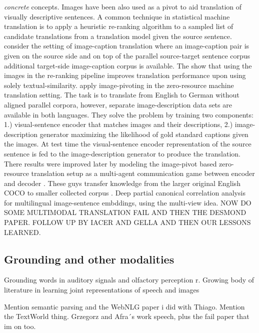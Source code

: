 \emph{concrete} concepts.
Images have been also used as a pivot to aid translation of visually descriptive sentences.
A common technique in statistical machine translation is to apply a heuristic re-ranking algorithm
to a sampled list of candidate translations from a translation model given the source sentence.
\cite{hitschler2016multimodal} consider the setting of image-caption translation where an
image-caption pair is given on the source side and on top of the parallel source-target sentence corpus
additional target-side image-caption corpus is available. The show that using the images in the re-ranking
pipeline improves translation performance upon using solely textual-similarity.
\cite{nakayama2017zero} apply image-pivoting in the zero-resource machine translation setting.
The task is to translate from English to German without aligned parallel corpora, however,
separate image-description data sets are available in both languages. They solve the problem by
training two components: 1.) visual-sentence encoder that matches images and their descriptions,
2.) image-description generator maximizing the likelihood of gold standard captions given the images.
At test time the visual-sentence encoder representation of the source sentence is fed to the
image-description generator to produce the translation. There results were improved later by modeling
the image-pivot based zero-resource translation setup as a multi-agent communication game between
encoder and decoder \cite{chen2018zero,lee2017emergent}.
These guys transfer knowledge from the larger original English COCO to smaller collected
corpus \cite{miyazaki2016cross}.
Deep partial canonical correlation analysis for \cite{rotman2018bridging}
multilingual image-sentence embddings, using the multi-view idea. NOW DO SOME MULTIMODAL TRANSLATION FAIL
AND THEN THE DESMOND PAPER. FOLLOW UP BY IACER AND GELLA AND THEN OUR LESSONS LEARNED.


\subsection{Grounding and other modalities}
Grounding words in auditory signals \cite{kiela2015multi,lopopolo2015sound} and
 olfactory perception \cite{kiela2015grounding}r. Growing body of literature in learning joint representations
 of speech and images \cite{harwath2016unsupervised,chrupala2017representations,harwath2018jointly}


Mention semantic parsing and the WebNLG paper i did with Thiago. Mention the TextWorld thing. Grzegorz
and Afra´s work speech, plus the fail paper that im on too.

